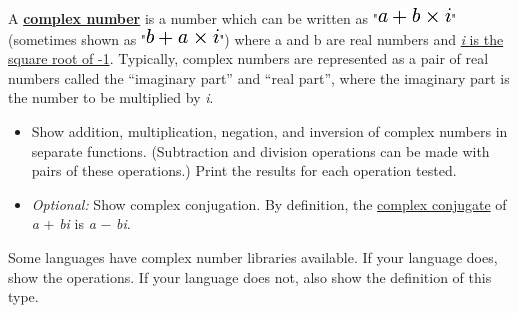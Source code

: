 A \textbf{\href{http://en.wikipedia.org/wiki/Complex\_number}{complex
number}} is a number which can be written as
"\includegraphics[scale=.6]{graphics/af18dab590e0f994693fc34b6803c1e1.png}"
(sometimes shown as
"\includegraphics[scale=.6]{graphics/1465b5194836899e7331a9fcf9cda03e.png}")
where a and b are real numbers and
\href{http://en.wikipedia.org/wiki/Imaginary\_unit}{\emph{i} is the
square root of -1}. Typically, complex numbers are represented as a pair
of real numbers called the ``imaginary part'' and ``real part'', where
the imaginary part is the number to be multiplied by \emph{i}.

\begin{itemize}
\item
  Show addition, multiplication, negation, and inversion of complex
  numbers in separate functions. (Subtraction and division operations
  can be made with pairs of these operations.) Print the results for
  each operation tested.
\item
  \emph{Optional:} Show complex conjugation. By definition, the
  \href{http://en.wikipedia.org/wiki/complex\_conjugate}{complex
  conjugate} of \emph{a} + \emph{b}\emph{i} is \emph{a} −
  \emph{b}\emph{i}.
\end{itemize}

Some languages have complex number libraries available. If your language
does, show the operations. If your language does not, also show the
definition of this type.


